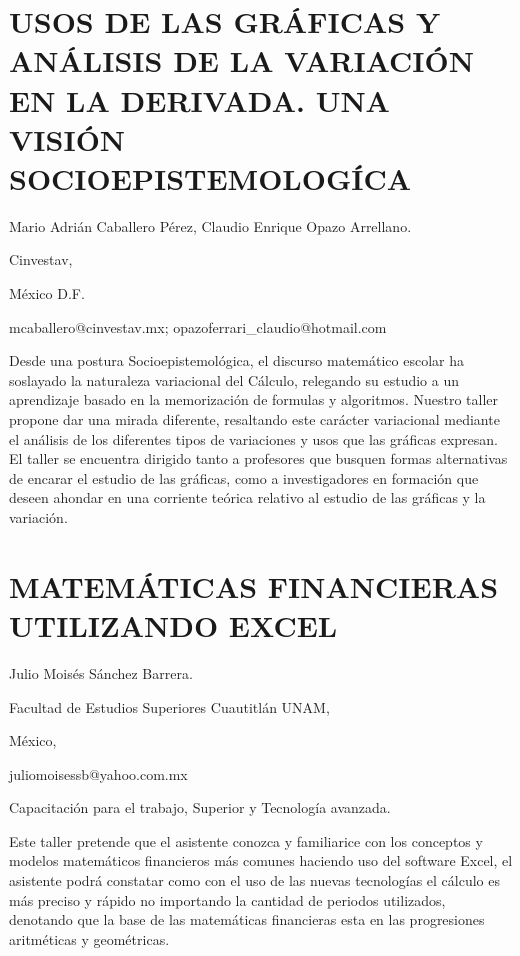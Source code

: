 \section{\uppercase{ Usos de las gráficas y análisis de la variación en la
derivada. Una visión Socioepistemologíca}}

\begin{datos}

Mario Adrián Caballero Pérez, Claudio Enrique Opazo Arrellano.

Cinvestav, 

México D.F. 

mcaballero@cinvestav.mx; opazoferrari\_claudio@hotmail.com 

\end{datos}

Desde una postura Socioepistemológica, el discurso matemático escolar
ha soslayado la naturaleza variacional del Cálculo, relegando su estudio
a un aprendizaje basado en la memorización de formulas y algoritmos.
Nuestro taller propone dar una mirada diferente, resaltando este carácter
variacional mediante el análisis de los diferentes tipos de variaciones
y usos que las gráficas expresan. El taller se encuentra dirigido
tanto a profesores que busquen formas alternativas de encarar el estudio
de las gráficas, como a investigadores en formación que deseen ahondar
en una corriente teórica relativo al estudio de las gráficas y la
variación.


\section{MATEMÁTICAS FINANCIERAS UTILIZANDO EXCEL}

\begin{datos}

Julio Moisés Sánchez Barrera.

Facultad de Estudios Superiores Cuautitlán UNAM,

México,

juliomoisessb@yahoo.com.mx

\end{datos}

Capacitación para el trabajo, Superior y Tecnología avanzada.

Este taller pretende que el asistente conozca y familiarice con los
conceptos y modelos matemáticos financieros más comunes haciendo uso
del software Excel, el asistente podrá constatar como con el uso de
las nuevas tecnologías el cálculo es más preciso y rápido no importando
la cantidad de periodos utilizados, denotando que la base de las matemáticas
financieras esta en las progresiones aritméticas y geométricas. 

